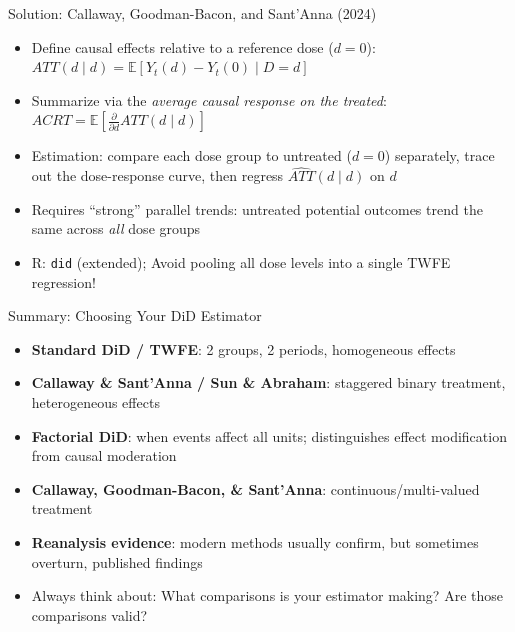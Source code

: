 \documentclass[10pt, handout]{beamer}
\begin{document}
\begin{frame}{Solution: Callaway, Goodman-Bacon, and Sant'Anna (2024)}
  \begin{itemize}
    \item Define causal effects relative to a reference dose ($d = 0$):
      $ATT(d \mid d) = \mathbb{E}[Y_t(d) - Y_t(0) \mid D = d]$
    \item Summarize via the \textit{average causal response on the treated}:
      $ACRT = \mathbb{E}\!\left[\frac{\partial}{\partial d} ATT(d \mid d)\right]$
    \item Estimation: compare each dose group to untreated ($d=0$) separately, trace out the dose-response curve, then regress $\widehat{ATT}(d \mid d)$ on $d$
    \item Requires ``strong'' parallel trends: untreated potential outcomes trend the same across \textit{all} dose groups
    \item R: \texttt{did} (extended); Avoid pooling all dose levels into a single TWFE regression!
  \end{itemize}
\end{frame}

\begin{frame}{Summary: Choosing Your DiD Estimator}
  \begin{itemize}
    \item \textbf{Standard DiD / TWFE}: 2 groups, 2 periods, homogeneous effects
    \item \textbf{Callaway \& Sant'Anna / Sun \& Abraham}: staggered binary treatment, heterogeneous effects
    \item \textbf{Factorial DiD}: when events affect all units; distinguishes effect modification from causal moderation
    \item \textbf{Callaway, Goodman-Bacon, \& Sant'Anna}: continuous/multi-valued treatment
    \item \textbf{Reanalysis evidence}: modern methods usually confirm, but sometimes overturn, published findings
    \item Always think about: What comparisons is your estimator making? Are those comparisons valid?
  \end{itemize}
\end{frame}

\end{document}
